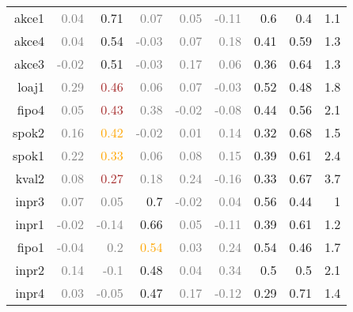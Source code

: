 \documentclass[10pt,a4paper]{article}
\begin{document}
\begin{table}[htbp]
\begin{tabular}{r|rrrrrrrr}
    akce1 & \textcolor{Gray}{0.04} & \textcolor{NavyBlue}{0.71} & \textcolor{Gray}{0.07} & \textcolor{Gray}{0.05} & \textcolor{Gray}{-0.11} & 0.6   & 0.4   & 1.1 \\
    akce4 & \textcolor{Gray}{0.04} & \textcolor{NavyBlue}{0.54} & \textcolor{Gray}{-0.03} & \textcolor{Gray}{0.07} & \textcolor{Gray}{0.18} & 0.41  & 0.59  & 1.3 \\
    akce3 & \textcolor{Gray}{-0.02} & \textcolor{NavyBlue}{0.51} & \textcolor{Gray}{-0.03} & \textcolor{Gray}{0.17} & \textcolor{Gray}{0.06} & 0.36  & 0.64  & 1.3 \\
    loaj1 & \textcolor{Gray}{0.29} & \textcolor{Brown}{0.46} & \textcolor{Gray}{0.06} & \textcolor{Gray}{0.07} & \textcolor{Gray}{-0.03} & 0.52  & 0.48  & 1.8 \\
    fipo4 & \textcolor{Gray}{0.05} & \textcolor{Brown}{0.43} & \textcolor{Gray}{0.38} & \textcolor{Gray}{-0.02} & \textcolor{Gray}{-0.08} & 0.44  & 0.56  & 2.1 \\
    spok2 & \textcolor{Gray}{0.16} & \textcolor{Orange}{0.42} & \textcolor{Gray}{-0.02} & \textcolor{Gray}{0.01} & \textcolor{Gray}{0.14} & 0.32  & 0.68  & 1.5 \\
    spok1 & \textcolor{Gray}{0.22} & \textcolor{Orange}{0.33} & \textcolor{Gray}{0.06} & \textcolor{Gray}{0.08} & \textcolor{Gray}{0.15} & 0.39  & 0.61  & 2.4 \\
    kval2 & \textcolor{Gray}{0.08} & \textcolor{Brown}{0.27} & \textcolor{Gray}{0.18} & \textcolor{Gray}{0.24} & \textcolor{Gray}{-0.16} & 0.33  & 0.67  & 3.7 \\
    inpr3 & \textcolor{Gray}{0.07} & \textcolor{Gray}{0.05} & \textcolor{NavyBlue}{0.7} & \textcolor{Gray}{-0.02} & \textcolor{Gray}{0.04} & 0.56  & 0.44  & 1 \\
    inpr1 & \textcolor{Gray}{-0.02} & \textcolor{Gray}{-0.14} & \textcolor{NavyBlue}{0.66} & \textcolor{Gray}{0.05} & \textcolor{Gray}{-0.11} & 0.39  & 0.61  & 1.2 \\
    fipo1 & \textcolor{Gray}{-0.04} & \textcolor{Gray}{0.2} & \textcolor{Orange}{0.54} & \textcolor{Gray}{0.03} & \textcolor{Gray}{0.24} & 0.54  & 0.46  & 1.7 \\
    inpr2 & \textcolor{Gray}{0.14} & \textcolor{Gray}{-0.1} & \textcolor{NavyBlue}{0.48} & \textcolor{Gray}{0.04} & \textcolor{Gray}{0.34} & 0.5   & 0.5   & 2.1 \\
    inpr4 & \textcolor{Gray}{0.03} & \textcolor{Gray}{-0.05} & \textcolor{NavyBlue}{0.47} & \textcolor{Gray}{0.17} & \textcolor{Gray}{-0.12} & 0.29  & 0.71  & 1.4 \\

\end{tabular}
\end{table}
\end{document}
